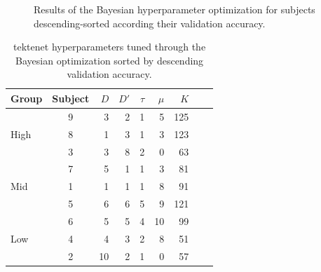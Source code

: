 \begin{figure}[H]
\centering
\setlength{}
\setlength{}
\setlength{}
\setlength{}
\label{fig:hyper}
\caption{Results of the Bayesian hyperparameter optimization for subjects descending-sorted according their validation accuracy.}
\end{figure}
\begin{table}[htbp]
\centering
\caption{\gls{tektenet} hyperparameters tuned through the Bayesian optimization sorted by descending validation accuracy.}
 \label{tab:hyperparameters_sorted}
\begin{tabular}{lcrrrrrrr}
\toprule
\textbf{Group} & \textbf{Subject} & \textbf{$D$} & \textbf{$D'$} & \textbf{$\tau$} & \textbf{$\mu$} & \textbf{$K$} \\
\midrule
\multirow{3}{*}{High} & 9  &  3 &  2 & 1 &  5 & 125\\
& 8  &  1 &  3 & 1 &  3 & 123\\
& 3  &  3 &  8 & 2 &  0 &  63\\
\midrule
\multirow{3}{*}{Mid} & 7  &  5 &  1 & 1 &  3 &  81\\
& 1  &  1 &  1 & 1 &  8 &  91\\
& 5  &  6 &  6 & 5 &  9 & 121\\
\midrule
\multirow{3}{*}{Low} & 6  &  5 &  5 & 4 & 10 &  99\\
& 4  &  4 &  3 & 2 &  8 &  51\\
& 2  & 10 &  2 & 1 &  0 &  57\\
\bottomrule
\end{tabular}
\end{table}
